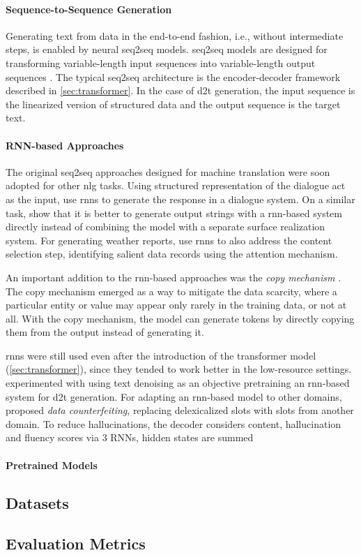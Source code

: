 \paragraph{Sequence-to-Sequence Generation} Generating text from data in the end-to-end fashion, i.e., without intermediate steps, is enabled by neural \ac{seq2seq} models. \Ac{seq2seq} models are designed for transforming variable-length input sequences into variable-length output sequences \cite{cho2014learning,sutskever2014sequence}. The typical \ac{seq2seq} architecture is the encoder-decoder framework described in \autoref{sec:transformer}. In the case of \ac{d2t} generation, the input sequence is the linearized version of structured data and the output sequence is the target text.

\paragraph{RNN-based Approaches} The original seq2seq approaches designed for machine translation \cite{cho2014learning,sutskever2014sequence} were soon adopted for other \ac{nlg} tasks. Using structured representation of the dialogue act as the input, \citet{wen2015semantically} use \acp{rnn} to generate the response in a dialogue system. On a similar task, \citet{dusekSequencetoSequenceGenerationSpoken2016} show that it is better to generate output strings with a \ac{rnn}-based system directly instead of combining the model with a separate surface realization system. For generating weather reports, \citet{mei2016talk} use \acp{rnn} to also address the content selection step, identifying salient data records using the attention mechanism.

An important addition to the \ac{rnn}-based approaches was the \emph{copy mechanism} \cite{gu2016incorporating,seeGetPointSummarization2017}. The copy mechanism emerged as a way to mitigate the data scarcity, where a particular entity or value may appear only rarely in the training data, or not at all. With the copy mechanism, the model can generate tokens by directly copying them from the output instead of generating it.


\acp{rnn} were still used even after the introduction of the transformer model (\autoref{sec:transformer}), since they tended to work better in the low-resource settings. \citet{freitagUnsupervisedNaturalLanguage2018} experimented with using text denoising as an objective pretraining an \ac{rnn}-based system for \ac{d2t} generation. For adapting an \ac{rnn}-based model to other domains, \citet{wen2020recurrent} proposed \emph{data counterfeiting}, replacing delexicalized slots with slots from another domain. To reduce hallucinations, \citet{rebuffel2021controlling} the decoder considers content, hallucination and fluency scores via 3 RNNs, hidden states are summed



\paragraph{Pretrained Models}

\subsection{Datasets}
\label{sec:datasets}
\subsection{Evaluation Metrics}
\label{sec:evaluation}
